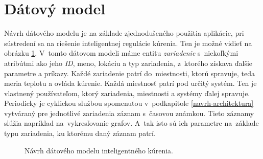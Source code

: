 \section{Dátový model}\label{navrh-datamodel}
Návrh dátového modelu je na základe zjednodušeného použitia aplikácie, pri sústredení sa na riešenie inteligentnej regulácie kúrenia. Ten je možné vidieť na obrázku \ref{fig:designedModel}.
V~tomto dátovom modeli máme entitu \emph{zariadenie} s~niekoľkými atribútmi ako jeho \emph{ID}, meno, lokáciu a typ zariadenia, z~ktorého získava ďalšie parametre a príkazy. 
Každé zariadenie patrí do~miestnosti, ktorú spravuje, teda meria teplotu a ovláda kúrenie. Každá miestnosť patrí pod určitý systém. 
Ten je vlastnený používateľom, ktorý zariadenia, miestnosti a systémy ďalej spravuje. 
Periodicky je cyklickou službou spomenutou v~podkapitole \ref{navrh-architektura} vytváraný pre jednotlivé zariadenia záznam s~časovou známkou. 
Tieto záznamy slúžia napríklad na~vykresľovanie grafov. 
A~tak isto sú ich parametre na~základe typu zariadenia, ku ktorému daný záznam patrí.
\begin{figure}[h!]
    \centering
    
    \caption{Návrh dátového modelu inteligentného kúrenia.}
    \label{fig:designedModel}
\end{figure}
